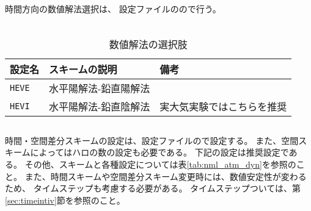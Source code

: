 \section{\SecBasicDynamicsSetting} \label{sec:atmos_dyn}


\subsection{\SubsecDynsolverSetting}  \label{subsec:atmos_dyn_sover}
時間方向の数値解法選択は、
設定ファイルのので行う。\\

\\

\begin{table}[h]
\begin{center}
  \caption{数値解法の選択肢}
  \label{tab:nml_dyn}
  \begin{tabularx}{150mm}{llX} \hline
    \rowcolor[gray]{0.9}  設定名 & スキームの説明 & 備考\\ \hline
      \verb|HEVE|  & 水平陽解法-鉛直陽解法 & \\
      \verb|HEVI|  & 水平陽解法-鉛直陰解法 & 実大気実験ではこちらを推奨\\
    \hline
  \end{tabularx}
\end{center}
\end{table}


\subsection{\SubsecDynSchemeSetting} \label{subsec:atmos_dyn_scheme}
時間・空間差分スキームの設定は、設定ファイルので設定する。
また、空間スキームによってはハロの数の設定も必要である。
下記の設定は推奨設定である。
その他、スキームと各種設定については表\ref{tab:nml_atm_dyn}を参照のこと。
また、時間スキームや空間差分スキーム変更時には、数値安定性が変わるため、
タイムステップも考慮する必要がある。
タイムステップついては、第\ref{sec:timeintiv}節を参照のこと。\\

